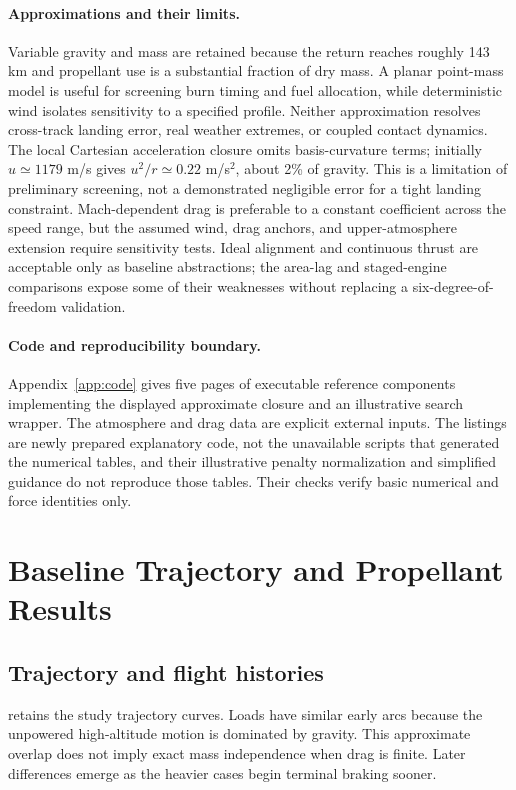 \documentclass[11pt,a4paper]{article}
\begin{document}
\paragraph{Approximations and their limits.}
Variable gravity and mass are retained because the return reaches roughly 143 km and propellant use is a substantial fraction of dry mass. A planar point-mass model is useful for screening burn timing and fuel allocation, while deterministic wind isolates sensitivity to a specified profile. Neither approximation resolves cross-track landing error, real weather extremes, or coupled contact dynamics. The local Cartesian acceleration closure omits basis-curvature terms; initially $u\simeq1179$ m/s gives $u^2/r\simeq0.22$ m/s$^2$, about 2\% of gravity. This is a limitation of preliminary screening, not a demonstrated negligible error for a tight landing constraint. Mach-dependent drag is preferable to a constant coefficient across the speed range, but the assumed wind, drag anchors, and upper-atmosphere extension require sensitivity tests. Ideal alignment and continuous thrust are acceptable only as baseline abstractions; the area-lag and staged-engine comparisons expose some of their weaknesses without replacing a six-degree-of-freedom validation.

\paragraph{Code and reproducibility boundary.}
Appendix~\ref{app:code} gives five pages of executable reference components implementing the displayed approximate closure and an illustrative search wrapper. The atmosphere and drag data are explicit external inputs. The listings are newly prepared explanatory code, not the unavailable scripts that generated the numerical tables, and their illustrative penalty normalization and simplified guidance do not reproduce those tables. Their checks verify basic numerical and force identities only.

\section{Baseline Trajectory and Propellant Results}
\subsection{Trajectory and flight histories}
 retains the study trajectory curves. Loads have similar early arcs because the unpowered high-altitude motion is dominated by gravity. This approximate overlap does not imply exact mass independence when drag is finite. Later differences emerge as the heavier cases begin terminal braking sooner.
\end{document}
